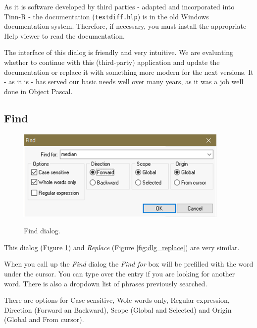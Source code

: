 As it is software developed by third parties - adapted and incorporated into Tinn-R - the documentation
(\texttt{textdiff.hlp}) is in the old Windows documentation system. Therefore, if necessary, you must
install the appropriate Help viewer to read the documentation.

The interface of this dialog is friendly and very intuitive. We are evaluating whether to continue with
this (third-party) application and update the documentation or replace it with something more modern
for the next versions. It - as it is - has served our basic needs well over many years, as it was a
job well done in Object Pascal.


\hypertarget{dlg_find}{}
\subsection{Find}

\begin{figure}[H]
  \includegraphics[scale=0.8]{./res/dlg_find.png} \\
  \caption{Find dialog.}
  \label{fig:dlg_find}
\end{figure}
This dialog
(Figure \ref{fig:dlg_find})
and \textit{Replace}
(Figure \ref{fig:dlg_replace})
are very similar.

When you call up the \textit{Find} dialog the \textit{Find for} box will be
prefilled with the word under the cursor. You can type over the entry if you
are looking for another word. There is also a dropdown list of phrases
previously searched.

There are options for Case sensitive, Wole words only, Regular expression,
Direction (Forward an Backward), Scope (Global and Selected) and Origin (Global and From cursor).


\hypertarget{dlg_working_highlighters}{}
